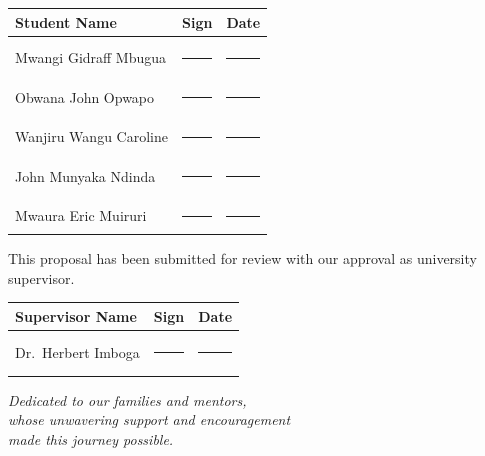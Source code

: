 \documentclass[12pt,a4paper,oneside]{report}
\numberwithin{equation}{chapter}
\begin{document}
\vspace{1.5cm}
\begin{table}[h!]
\centering
\begin{tabular}{p{6cm} p{5cm} p{5cm}}
    \textbf{Student Name} & \textbf{Sign} & \textbf{Date} \\
    \hline
    \vspace{0.3cm} \\
    Mwangi Gidraff Mbugua   & \rule{5cm}{0.4pt} & \rule{5cm}{0.4pt} \\
    \vspace{0.3cm} \\
    Obwana John Opwapo      & \rule{5cm}{0.4pt} & \rule{5cm}{0.4pt} \\
    \vspace{0.3cm} \\
    Wanjiru Wangu Caroline  & \rule{5cm}{0.4pt} & \rule{5cm}{0.4pt} \\
    \vspace{0.3cm} \\
    John Munyaka Ndinda     & \rule{5cm}{0.4pt} & \rule{5cm}{0.4pt} \\
    \vspace{0.3cm} \\
    Mwaura Eric Muiruri     & \rule{5cm}{0.4pt} & \rule{5cm}{0.4pt} \\
\end{tabular}
\end{table}

\vspace{2cm}
\noindent This proposal has been submitted for review with our approval as university supervisor.
\vspace{1.5cm}

\begin{table}[h!]
\centering
\begin{tabular}{p{5cm} p{3cm} p{5cm}}
    \textbf{Supervisor Name} & \textbf{Sign} & \textbf{Date} \\
    \hline
    \vspace{0.3cm} \\
    Dr.\ Herbert Imboga & \rule{5cm}{0.4pt} & \rule{5cm}{0.4pt} \\
    \vspace{0.3cm} \\
\end{tabular}
\end{table}

\newpage
\thispagestyle{empty}
\vspace*{4cm}
\begin{center}
    {\large\itshape
    Dedicated to our families and mentors,\\
    whose unwavering support and encouragement\\
    made this journey possible.}
\end{center}
\newpage
\end{document}
